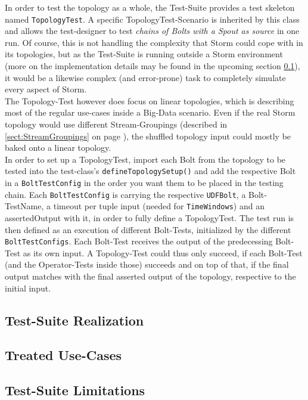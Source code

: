 \begin{description}
		In order to test the topology as a whole, the Test-Suite provides a test skeleton named \texttt{TopologyTest}. A specific TopologyTest-Scenario is inherited by this class and allows the test-designer to test \textit{chains of Bolts with a Spout as source} in one run. Of course, this is not handling the complexity that Storm could cope with in its topologies, but as the Test-Suite is running outside a Storm environment (more on the implementation details may be found in the upcoming section \ref{sect:TestSuiteRealization}), it would be a likewise complex (and error-prone) task to completely simulate every aspect of Storm.\\
		The Topology-Test however does focus on linear topologies, which is describing most of the regular use-cases inside a Big-Data scenario. Even if the real Storm topology would use different Stream-Groupings (described in \ref{sect:StreamGroupings} on page \pageref{StreamGroupings}), the shuffled topology input could mostly be baked onto a linear topology. \\
		In order to set up a TopologyTest, import each Bolt from the topology to be tested into the test-class's \texttt{defineTopologySetup()} and add the respective Bolt in a \texttt{BoltTestConfig} in the order you want them to be placed in the testing chain. Each \texttt{BoltTestConfig} is carrying the respective \texttt{UDFBolt}, a Bolt-TestName, a timeout per tuple input (needed for \texttt{TimeWindows}) and an assertedOutput with it, in order to fully define a TopologyTest. The test run is then defined as an execution of different Bolt-Tests, initialized by the different \texttt{BoltTestConfigs}. Each Bolt-Test receives the output of the predecessing Bolt-Test as its own input. A Topology-Test could thus only succeed, if each Bolt-Test (and the Operator-Tests inside those) succeeds and on top of that, if the final output matches with the final asserted output of the topology, respective to the initial input.
		
		
	\end{description}

\subsection{Test-Suite Realization}
\label{sect:TestSuiteRealization}
	

\subsection{Treated Use-Cases}
\label{sect:TestSuiteUseCases}
	

\subsection{Test-Suite Limitations}
\label{sect:TestSuiteLimitations}
	